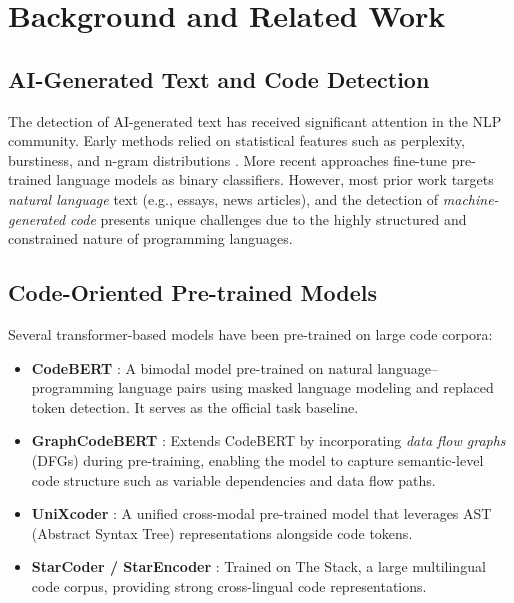 \documentclass[11pt]{article}
\begin{document}
\section{Background and Related Work}
\label{sec:related}

\subsection{AI-Generated Text and Code Detection}

The detection of AI-generated text has received significant attention in the NLP community. Early methods relied on statistical features such as perplexity, burstiness, and n-gram distributions \cite{mitchell2023detectgpt}. More recent approaches fine-tune pre-trained language models as binary classifiers. However, most prior work targets \textit{natural language} text (e.g., essays, news articles), and the detection of \textit{machine-generated code} presents unique challenges due to the highly structured and constrained nature of programming languages.

\subsection{Code-Oriented Pre-trained Models}

Several transformer-based models have been pre-trained on large code corpora:

\begin{itemize}
    \item \textbf{CodeBERT} \cite{feng-etal-2020-codebert}: A bimodal model pre-trained on natural language--programming language pairs using masked language modeling and replaced token detection. It serves as the official task baseline.
    \item \textbf{GraphCodeBERT} \cite{guo2021graphcodebert}: Extends CodeBERT by incorporating \textit{data flow graphs} (DFGs) during pre-training, enabling the model to capture semantic-level code structure such as variable dependencies and data flow paths.
    \item \textbf{UniXcoder} \cite{guo2022unixcoder}: A unified cross-modal pre-trained model that leverages AST (Abstract Syntax Tree) representations alongside code tokens.
    \item \textbf{StarCoder / StarEncoder} \cite{li2023starcoder}: Trained on The Stack, a large multilingual code corpus, providing strong cross-lingual code representations.
\end{itemize}
\end{document}
